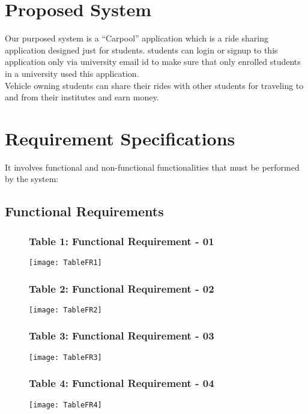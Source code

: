 \section{Proposed System}
Our purposed system is a “Carpool” application which is a ride sharing application designed just for students. students can login or signup to this application only via university email id to make sure that only enrolled students in a university used this application.
\\ Vehicle owning students can share their rides with other students for traveling to and from their institutes and earn money.

\section{Requirement Specifications}
It involves functional and non-functional functionalities that must be performed by the system:

\subsection{Functional Requirements}

\begin{figure}[ht]
\subsubsection{Table 1: Functional Requirement - 01}
\centering
\texttt{[image: TableFR1]}
\end{figure}

\begin{figure}[ht]
\subsubsection{Table 2: Functional Requirement - 02}
\centering
\texttt{[image: TableFR2]}
\end{figure}

\begin{figure}[ht]
\subsubsection{Table 3: Functional Requirement - 03}
\centering
\texttt{[image: TableFR3]}
\end{figure}

\begin{figure}[ht]
\subsubsection{Table 4: Functional Requirement - 04}
\centering
\texttt{[image: TableFR4]}
\end{figure}

